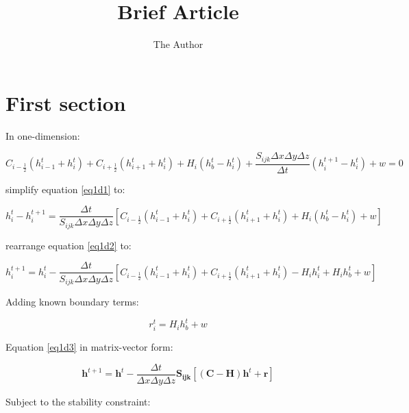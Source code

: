 \documentclass[11pt]{article} %
\title{Brief Article}
\author{The Author}
\begin{document}
\maketitle

\section{First section}

In one-dimension:

\begin{equation} \label{eq1d1}
C_{i-\frac{1}{2}} \left( h^t_{i-1} + h^t_i \right) + C_{i+\frac{1}{2}} \left( h^t_{i+1} + h^t_i \right) + H_{i}\left( h^{t}_{b} - h^{t}_{i} \right) + \frac{S_{ijk} \Delta x \Delta y \Delta z}{\Delta t} \left( h^{t+1}_{i} - h^t_i \right) + w = 0
\end{equation}

\noindent simplify equation \ref{eq1d1} to:

\begin{equation} \label{eq1d2}
h^t_{i} - h^{t+1}_i = \frac{\Delta t}{S_{ijk} \Delta x \Delta y \Delta z} \left[ C_{i-\frac{1}{2}} \left( h^t_{i-1} + h^t_i \right) + C_{i+\frac{1}{2}} \left( h^t_{i+1} + h^t_i \right) + H_{i}\left( h^{t}_{b} - h^{t}_{i} \right) + w \right]
\end{equation}

\noindent rearrange equation \ref{eq1d2} to:

\begin{equation} \label{eq1d3}
h^{t+1}_i = h^t_{i} - \frac{\Delta t}{S_{ijk} \Delta x \Delta y \Delta z} \left[ C_{i-\frac{1}{2}} \left( h^t_{i-1} + h^t_i \right) + C_{i+\frac{1}{2}} \left( h^t_{i+1} + h^t_i \right) - H_{i} h^{t}_{i} +  H_{i} h^{t}_{b} + w \right] 
\end{equation}

Adding known boundary terms:

\begin{equation} \label{eq1d4}
r^{t}_{i} = H_{i} h^{t}_{b} + w 
\end{equation}


Equation \ref{eq1d3} in matrix-vector form:

\begin{equation} \label{eq1dvec}
\mathbf{h}^{t+1} = \mathbf{h}^t - \frac{\Delta t}{\Delta x \Delta y \Delta z} \mathbf{S_{ijk} } \left[ \left ( \mathbf{C} - \mathbf{H} \right ) \mathbf{h}^{t} + \mathbf{r} \right] 
\end{equation}

\noindent Subject to the stability constraint:
\end{document}

